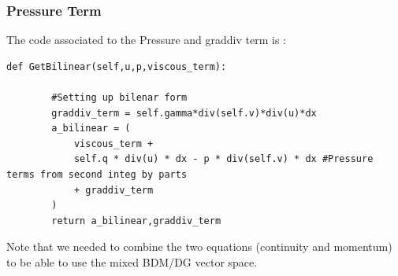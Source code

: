 \documentclass[11pt,twoside,a4paper]{article}
\begin{document}
\subsubsection{Pressure Term}
The code associated to the Pressure and graddiv term is :
\begin{lstlisting}
def GetBilinear(self,u,p,viscous_term):

        #Setting up bilenar form
        graddiv_term = self.gamma*div(self.v)*div(u)*dx
        a_bilinear = (
            viscous_term +
            self.q * div(u) * dx - p * div(self.v) * dx #Pressure terms from second integ by parts
            + graddiv_term
        )
        return a_bilinear,graddiv_term
\end{lstlisting}
Note that we needed to combine the two equations (continuity and momentum) to be able to use the mixed BDM/DG vector space.
\end{document}
